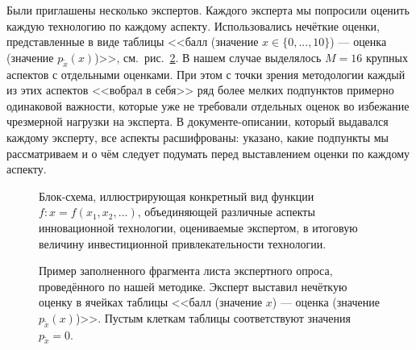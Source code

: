 Были приглашены несколько экспертов. Каждого эксперта мы попросили оценить каждую технологию по каждому аспекту. Использовались нечёткие оценки, представленные в виде таблицы <<балл (значение $x \in \{0, ..., 10\}$) --- оценка (значение $p_{\tilde x}(x)$)>>, см.~рис.~\ref{ris:expert_sample}. В нашем случае выделялось $M = 16$ крупных аспектов с отдельными оценками. При этом с точки зрения методологии каждый из этих аспектов <<вобрал в себя>> ряд более мелких подпунктов примерно одинаковой важности, которые уже не требовали отдельных оценок во избежание чрезмерной нагрузки на эксперта. В документе-описании, который выдавался каждому эксперту, все аспекты расшифрованы: указано, какие подпункты мы рассматриваем и о чём следует  подумать перед выставлением оценки по каждому аспекту.

\begin{figure}[H]
\caption{\small Блок-схема, иллюстрирующая конкретный вид функции $f: x = f(x_1, x_2, ...)$, объединяющей различные аспекты инновационной технологии, оцениваемые экспертом, в итоговую величину инвестиционной привлекательности технологии. }
\label{ris:tech_scheme}
\end{figure}

 
\begin{figure}[H]
\caption{\small Пример заполненного фрагмента листа экспертного опроса, проведённого по нашей методике. Эксперт выставил нечёткую оценку в ячейках таблицы <<балл (значение $x$) --- оценка (значение $p_{\tilde x}(x)$)>>. Пустым клеткам таблицы соответствуют значения $p_{\tilde x} = 0$. }
\label{ris:expert_sample}
\end{figure}

